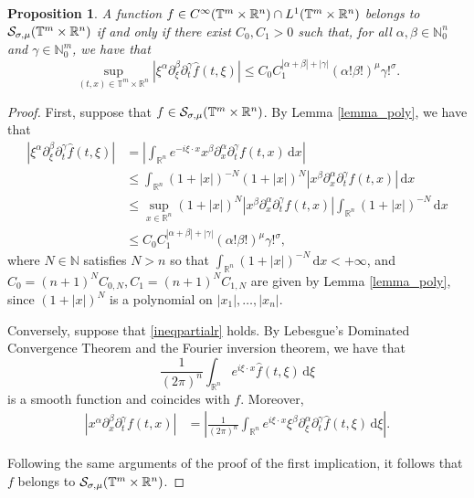 \documentclass[11pt,reqno]{amsart}
\numberwithin{equation}{section}
\newtheorem{prop}[theorem]{Proposition}
\theoremstyle{definition}
\theoremstyle{definition}
\newcommand{\T}{\mathbb{T}}
\newcommand{\G}{\mathnormal{\mathbb{T}^{m}\times\mathbb{R}^n}}
\newcommand{\R}{\mathbb{R}}
\newcommand{\N}{\mathbb{N}}
\renewcommand{\S}{\mathcal{S}_{\sigma,\mu}(\G)}
\begin{document}
    \begin{prop}\label{propdecaypartialxi}
		A function $f\in C^\infty(\G)\cap L^1(\T^m\times\R^n)$ belongs to $\S$ if and only if there exist $C_0,C_1>0$ such that, for all $\alpha,\beta\in\N_0^n$ and $\gamma\in\N_0^m$, we have that
	\begin{equation}\label{ineqpartialr}
        \sup_{(t,x)\in \T^m\times\R^n} |\xi^\alpha\partial_\xi^\beta\partial_t^\gamma\widehat{f}(t,\xi)|\leq C_0C_1^{|\alpha+\beta|+|\gamma|}(\alpha!\beta!)^\mu\gamma!^\sigma.
	\end{equation}
	\end{prop}
    \begin{proof}
    First, suppose that $f\in\S$. By Lemma \ref{lemma_poly}, we have that
    \begin{align*}
        |\xi^\alpha\partial_\xi^\beta\partial_t^\gamma\widehat{f}(t,\xi)| & = \left|\int_{\R^n}e^{-i\xi\cdot x}x^\beta\partial_x^\alpha\partial_t^\gamma f(t,x)\,\mathrm{d}x\right|\\
        & \leq \int_{\R^n}(1+|x|)^{-N}(1+|x|)^{N}|x^\beta\partial_x^\alpha\partial_t^\gamma f(t,x)|\,\mathrm{d}x\\
        & \leq \sup_{x\in\R^n}(1+|x|) ^{N}|x^\beta\partial_x^\alpha\partial_t^\gamma f(t,x)| \int_{\R^n}(1+|x|)^{-N}\,\mathrm{d}x\\
        & \leq C_0C_1^{|\alpha+\beta|+|\gamma|}(\alpha!\beta!)^\mu\gamma!^\sigma,
    \end{align*}
    where $N\in\N$ satisfies $N>n$ so that $\int_{\R^n}(1+|x|)^{-N}\,\mathrm{d}x<+\infty$, and $C_{0}=(n+1)^NC_{0,N}, C_1=(n+1)^NC_{1,N}$ are given by Lemma \ref{lemma_poly}, since $(1+|x|)^{N}$ is a polynomial on $|x_1|,\dots,|x_n|$.

    Conversely, suppose that \eqref{ineqpartialr} holds. By Lebesgue's Dominated Convergence Theorem and the Fourier inversion theorem, we have that
    \[\frac{1}{(2\pi)^n}\int_{\R^n}e^{i\xi\cdot x}\widehat{f}(t,\xi)\,\mathrm{d}\xi\]
    is a smooth function and coincides with $f$. Moreover,
    \begin{align*}
        |x^\alpha\partial_x^\beta\partial_t^\gamma f(t,x)| & = \left|\frac{1}{(2\pi)^n}\int_{\R^n}e^{i\xi\cdot x}\xi^\beta\partial_\xi^\alpha\partial_t^\gamma \widehat{f}(t,\xi)\,\mathrm{d}\xi\right|.
    \end{align*}
    
    Following the same arguments of the proof of the first implication, it follows that $f$ belongs to $\S$.
    \end{proof}
\end{document}
